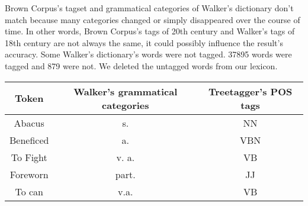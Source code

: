 Brown Corpus's tagset and grammatical categories of Walker's dictionary don't match
because many categories changed or simply disappeared over the course of time.
In other words, Brown Corpus's tags of 20th century and Walker's tags of 18th century
are not always the same, it could possibly influence the result's accuracy. 
Some Walker's dictionary's words were not tagged. 37895 words were tagged and 879 were not. We deleted the untagged words from our lexicon. 



\begin{center}
\begin{tabular}{c|c|c}
\hline
 \rowcolor[gray]{.75}
\textbf{Token} & \textbf{Walker's grammatical categories} &  \textbf{Treetagger's POS tags} \\
\hline
Abacus & s. & NN \\
\hline
Beneficed & a. & VBN \\
\hline
To Fight & v. a. & VB \\
\hline
Foreworn & part. & JJ \\
\hline
To can  & v.a. & VB \\
\hline
\end{tabular}
\end{center}
